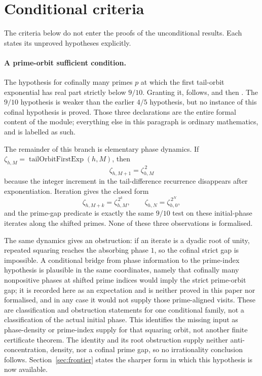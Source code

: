\section{Conditional criteria}\label{sec:conditional-criteria}

The criteria below do not enter the proofs of the unconditional results.
Each states its unproved hypotheses explicitly.

\paragraph{A prime-orbit sufficient condition.}
The hypothesis
for cofinally many primes $p$ at which the first tail-orbit exponential has
real part strictly below $9/10$.  Granting it,
follows, and then
.
The $9/10$ hypothesis is weaker than the earlier $4/5$ hypothesis, but no
instance of this cofinal hypothesis is proved.  Those three declarations are
the entire formal content of the module; everything else in this paragraph is
ordinary mathematics, and is labelled as such.

The remainder of this branch is elementary phase dynamics.  If
\(\zeta_{h,M}=\operatorname{tailOrbitFirstExp}(h,M)\), then
\[
  \zeta_{h,M+1}=\zeta_{h,M}^{\,2}
\]
because the integer increment in the tail-difference recurrence disappears
after exponentiation.  Iteration gives the closed form
\[
  \zeta_{h,M+k}=\zeta_{h,M}^{\,2^k},
  \qquad \zeta_{h,N}=\zeta_{h,0}^{\,2^N},
\]
and the prime-gap predicate is exactly the same $9/10$ test on these
initial-phase iterates along the shifted primes.  None of these three
observations is formalised.

The same dynamics gives an obstruction: if an iterate is a dyadic root of
unity, repeated squaring reaches the absorbing phase $1$, so the cofinal strict
gap is impossible.  A conditional bridge from phase information to the
prime-index hypothesis is plausible in the same coordinates, namely that
cofinally many nonpositive phases at shifted prime indices would imply the
strict prime-orbit gap; it is recorded here as an expectation and is neither
proved in this paper nor formalised, and in any case it would not supply those
prime-aligned visits.
These are classification and obstruction statements for one conditional
family, not a classification of the actual initial phase.
This identifies the missing input as phase-density or prime-index supply for
that squaring orbit, not another finite certificate theorem.  The identity
and its root obstruction supply neither anti-concentration, density, nor a
cofinal prime gap, so no irrationality conclusion follows.
Section~\ref{sec:frontier} states the sharper form
in which this hypothesis is now available.

